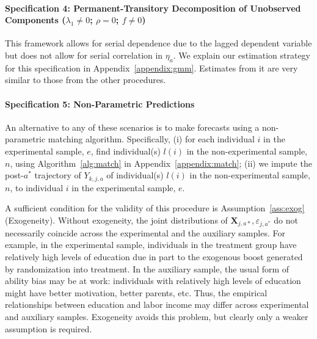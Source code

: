 \paragraph{Specification 4: Permanent-Transitory Decomposition of Unobserved Components ($\lambda_{1} \neq 0$; $\rho = 0$; $f \neq 0$)} \label{app:permtrans}

This framework allows for serial dependence due to the lagged dependent variable but does not allow for serial correlation in $\eta_{a}$. We explain our estimation strategy for this specification in Appendix~\ref{appendix:gmm}. Estimates from it are very similar to those from the other procedures.

\paragraph{Specification 5: Non-Parametric Predictions}

An alternative to any of these scenarios is to make forecasts using a non-parametric matching algorithm. Specifically, (i) for each individual $i$ in the experimental sample, $e$, find individual(s) $l(i)$ in the non-experimental sample, $n$, using Algorithm~\ref{alg:match} in Appendix~\ref{appendix:match}; (ii) we impute the post-$a^*$ trajectory of $Y_{k,j,a}$ of individual(s) $l(i)$ in the non-experimental sample, $n$, to individual $i$ in the experimental sample, $e$.

A sufficient condition for the validity of this procedure is Assumption~\ref{ass:exog} (Exogeneity). Without exogeneity, the joint distributions of $\bm{X}_{j,a*}, \varepsilon_{j,a^*}$ do not necessarily coincide across the experimental and the auxiliary samples. For example, in the experimental sample, individuals in the treatment group have relatively high levels of education due in part to the exogenous boost generated by randomization into treatment. In the auxiliary sample, the usual form of ability bias may be at work: individuals with relatively high levels of education might have better motivation, better parents, etc. Thus, the empirical relationships between education and labor income may differ across experimental and auxiliary samples. Exogeneity avoids this problem, but clearly only a weaker assumption is required.

